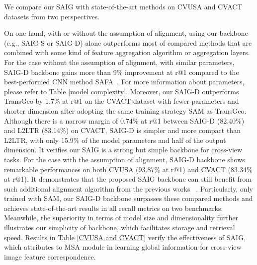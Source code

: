 \documentclass[sn-basic,iicol]{sn-jnl}
\theoremstyle{thmstyletwo}\newtheorem{example}{Example}\newtheorem{remark}{Remark}
\theoremstyle{thmstylethree}\newtheorem{definition}{Definition}
\begin{document}



We compare our SAIG with state-of-the-art methods on CVUSA and CVACT datasets from two perspectives.


On one hand, with or without the assumption of alignment, using our backbone (e.g., SAIG-S or SAIG-D) alone outperforms most of compared methods that are combined with some kind of feature aggregation algorithm or aggregation layers. 
For the case without the assumption of alignment, with similar parameters, SAIG-D backbone gains more than 9\% improvement at r@1 compared to the best-performed CNN method SAFA~\citep{SAFA2019}. For more information about parameters, please refer to Table \ref{model complexity}. 
Moreover, our SAIG-D outperforms TransGeo by 1.7\% at r@1 on the CVACT dataset with fewer parameters and shorter dimension after adopting the same training strategy SAM as TransGeo.
Although there is a narrow margin of 0.74\% at r@1 between SAIG-D (82.40\%) and L2LTR (83.14\%) on CVACT, SAIG-D is simpler and more compact than L2LTR, with only 15.9\% of the model parameters and half of the output dimension. It verifies our SAIG is a strong but simple backbone for cross-view tasks. 
For the case with the assumption of alignment, SAIG-D backbone shows remarkable performances on both CVUSA (93.87\% at r@1) and CVACT (83.34\% at r@1). It demonstrates that the proposed SAIG backbone can still benefit from such additional alignment algorithm from the previous works ~\citep{SAFA2019,DSM2020}. 
Particularly, only trained with SAM, our SAIG-D backbone surpasses these compared methods and achieves state-of-the-art results in all recall metrics on two benchmarks.
Meanwhile, the superiority in terms of model size and dimensionality further illustrates our simplicity of backbone, which facilitates storage and retrieval speed. Results in Table \ref{CVUSA and CVACT} verify the effectiveness of SAIG, which attributes to MSA module in learning global information for cross-view image feature correspondence. 
\end{document}
